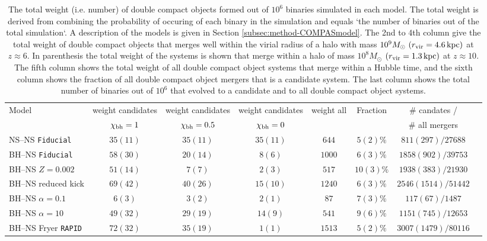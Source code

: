 \documentclass[a4paper,fleqn,usenatbib,useAMS,usedcolumn]{mnras}
\newcommand\Fiducial{\texttt{Fiducial }}
\newcommand\fexplOne{$  35(11) $}
\newcommand\EffExplOne{$ 35(11) $}
\newcommand\EffRefOne{$ 35(11) $}
\newcommand\NxMCOne{$  644  $}
\newcommand\NxAISOne{$ 5 (2) \%  $}
\newcommand\gainOne{$ 811 (297)  / 27688  $}
\newcommand\fexplTwo{$58(30)$}
\newcommand\EffExplTwo{$20(14)$}
\newcommand\EffRefTwo{$8(6)$}
\newcommand\NxMCTwo{$1000$}
\newcommand\NxAISTwo{$ 6 (3) \% $}
\newcommand\gainTwo{$1858 (902) / 39753$}
\newcommand\fexplThree{$ 51(14)$}
\newcommand\EffExplThree{$7(7)$}
\newcommand\EffRefThree{$2(3)$}
\newcommand\NxMCThree{$517$}
\newcommand\NxAISThree{$10(3) \%$}
\newcommand\gainThree{$1938(383) / 21930$}
\newcommand\fexplFour{$69(42)$}
\newcommand\EffExplFour{$40(26)$}
\newcommand\EffRefFour{$15(10)$}
\newcommand\NxMCFour{$1240$}
\newcommand\NxAISFour{$6(3) \%$}
\newcommand\gainFour{$2546 (1514) / 51442$}
\newcommand\fexplFive{$ 6 (3)$}
\newcommand\EffExplFive{$3(2)$}
\newcommand\EffRefFive{$2(1)$}
\newcommand\NxMCFive{$87$}
\newcommand\NxAISFive{$7(3) \%$}
\newcommand\gainFive{$117(67) / 1487$}
\newcommand\fexplSix{$49(32)$}
\newcommand\EffExplSix{$29(19)$}
\newcommand\EffRefSix{$14(9)$}
\newcommand\NxMCSix{$541$}
\newcommand\NxAISSix{$9(6) \%$}
\newcommand\gainSix{$1151(745) / 12653$}
\newcommand\fexplSeven{$72(32)$}
\newcommand\EffExplSeven{$35(19)$}
\newcommand\EffRefSeven{$1(1)$}
\newcommand\NxMCSeven{$1513$}
\newcommand\NxAISSeven{$5(2) \%$}
\newcommand\gainSeven{$3007 (1479)  / 80116$}
\begin{document}
\begin{table} %
\centering
\label{tab:comparison2}
\begin{tabular}{|l|c|c|c|c|c|c|c|}
\hline
\hline
  Model		    &   weight candidates   &   weight   candidates  		&    weight  candidates  &  weight  all    & Fraction &   $\#$ candates /   	\\
    &    $\chi_{\rm{bh}}=1$   &  $\chi_{\rm{bh}}=0.5$ 		&   $\chi_{\rm{bh}}=0$   &    &  &    $\#$ all mergers  	\\ \hline 
NS--NS \Fiducial    &  \fexplOne  & \EffExplOne  & \EffRefOne & \NxMCOne   & \NxAISOne & \gainOne  \\ \hline
BH--NS  \Fiducial   &  \fexplTwo  & \EffExplTwo  & \EffRefTwo & \NxMCTwo   & \NxAISTwo & \gainTwo  \\ %
BH--NS   $Z=0.002$   &  \fexplThree  & \EffExplThree & \EffRefThree & \NxMCThree   & \NxAISThree & \gainThree  \\ %
BH--NS reduced kick  &  \fexplFour  & \EffExplFour  & \EffRefFour & \NxMCFour   & \NxAISFour & \gainFour  \\
 BH--NS $\alpha =0.1$       &  \fexplFive  & \EffExplFive  & \EffRefFive & \NxMCFive   & \NxAISFive & \gainFive  \\
  BH--NS $\alpha =10$  &  \fexplSix  & \EffExplSix  & \EffRefSix & \NxMCSix   & \NxAISSix & \gainSix  \\ 
  BH--NS Fryer \texttt{RAPID}  &  \fexplSeven & \EffExplSeven  & \EffRefSeven & \NxMCSeven   & \NxAISSeven & \gainSeven  \\  
 \hline
\end{tabular}
\caption{The total weight (i.e. number) of double compact objects formed out of $10^6$ binaries simulated in each model. The total weight is derived from combining the probability of occuring of each binary in the simulation and equals `the number of binaries out of the total simulation`.  A description of the models is given in Section \ref{subsec:method-COMPASmodel}.  The 2nd to 4th column give the total weight of double compact objects that merges well within the virial radius of  a halo with mass $10^9 M_{\odot} \ (r_{\rm{vir}}   = 4.6 \, \rm{kpc})$ at $z \approx 6$. In parenthesis the total weight of the systems is shown that merge within a halo of mass   $10^8 M_{\odot} $ $ (r_{\rm{vir}}   = 1.3 \, \rm{kpc})$ at $z \approx 10$. The fifth column shows the total weight of all double compact object systems that merge within a Hubble time, and the sixth column shows the fraction  of all double compact object mergers that is a candidate system. The last column shows the total number of binaries out of $10^6$ that evolved to a candidate and to all double compact object systems.  }
\label{tab:summary-simulations}
\end{table} 
\end{document}
